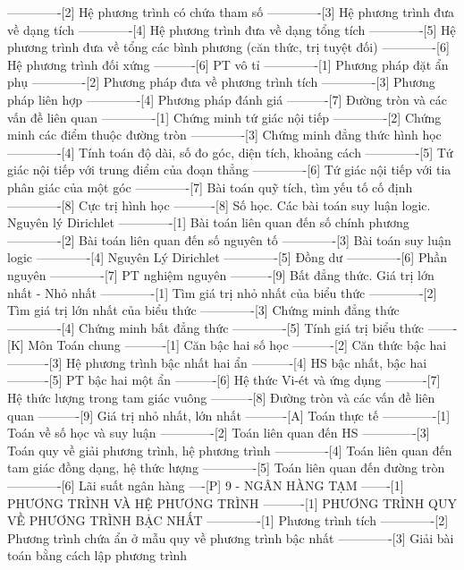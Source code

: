 -------------[2] Hệ phương trình có chứa tham số
-------------[3] Hệ phương trình đưa về dạng tích
-------------[4] Hệ phương trình đưa về dạng tổng tích
-------------[5] Hệ phương trình đưa về tổng các bình phương (căn thức, trị tuyệt đối)
-------------[6] Hệ phương trình đối xứng
----------[6] PT vô tỉ
-------------[1] Phương pháp đặt ẩn phụ
-------------[2] Phương pháp đưa về phương trình tích
-------------[3] Phương pháp liên hợp
-------------[4] Phương pháp đánh giá
----------[7] Đường tròn và các vấn đề liên quan
-------------[1] Chứng minh tứ giác nội tiếp
-------------[2] Chứng minh các điểm thuộc đường tròn
-------------[3] Chứng minh đẳng thức hình học
-------------[4] Tính toán độ dài, số đo góc, diện tích, khoảng cách
-------------[5] Tứ giác nội tiếp với trung điểm của đoạn thẳng
-------------[6] Tứ giác nội tiếp với tia phân giác của một góc
-------------[7] Bài toán quỹ tích, tìm yếu tố cố định
-------------[8] Cực trị hình học
----------[8] Số học. Các bài toán suy luận logic. Nguyên lý Dirichlet
-------------[1] Bài toán liên quan đến số chính phương
-------------[2] Bài toán liên quan đến số nguyên tố
-------------[3] Bài toán suy luận logic
-------------[4] Nguyên Lý Dirichlet
-------------[5] Đồng dư
-------------[6] Phần nguyên
-------------[7] PT nghiệm nguyên
----------[9] Bất đẳng thức. Giá trị lớn nhất - Nhỏ nhất
-------------[1] Tìm giá trị nhỏ nhất của biểu thức
-------------[2] Tìm giá trị lớn nhất của biểu thức
-------------[3] Chứng minh đẳng thức
-------------[4] Chứng minh bất đẳng thức
-------------[5] Tính giá trị biểu thức
-------[K] Môn Toán chung
----------[1] Căn bậc hai số học
----------[2] Căn thức bậc hai
----------[3] Hệ phương trình bậc nhất hai ẩn
----------[4] HS bậc nhất, bậc hai
----------[5] PT bậc hai một ẩn
----------[6] Hệ thức Vi-ét và ứng dụng
----------[7] Hệ thức lượng trong tam giác vuông
----------[8] Đường tròn và các vấn đề liên quan
----------[9] Giá trị nhỏ nhất, lớn nhất
----------[A] Toán thực tế
-------------[1] Toán về số học và suy luận
-------------[2] Toán liên quan đến HS
-------------[3] Toán quy về giải phương trình, hệ phương trình
-------------[4] Toán liên quan đến tam giác đồng dạng, hệ thức lượng
-------------[5] Toán liên quan đến đường tròn
-------------[6] Lãi suất ngân hàng
----[P] 9 - NGÂN HÀNG TẠM
-------[1] PHƯƠNG TRÌNH VÀ HỆ PHƯƠNG TRÌNH
----------[1] PHƯƠNG TRÌNH QUY VỀ PHƯƠNG TRÌNH BẬC NHẤT
-------------[1] Phương trình tích
-------------[2] Phương trình chứa ẩn ở mẫu quy về phương trình bậc nhất
-------------[3] Giải bài toán bằng cách lập phương trình
